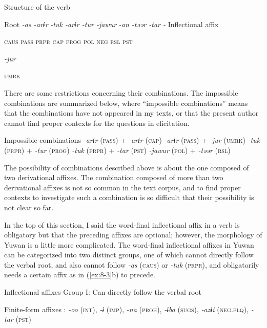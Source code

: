 \ea\label{ex:8-1}
  Structure of the verb

  Root  \textit{-as  -arɨr} %
\textit{-tuk  -arɨr  -tur  -jawur} %
\textit{-an  -təər  -tar  -} Inflectional affix

    \textsc{caus}  \textsc{pass}  \textsc{prpr}  \textsc{cap}  \textsc{prog}  \textsc{pol}  \textsc{neg}  \textsc{rsl}  \textsc{pst}

          \textit{-jur}

          \textsc{umrk}
\z

There are some restrictions concerning their combinations. The impossible combinations are summarized below, where “impossible combinations” means that the combinations have not appeared in my texts, or that the present author cannot find proper contexts for the questions in elicitation.

\ea\label{ex:8-2}
  Impossible combinations
    \ea *\textit{-arɨr} (\textsc{pass})   +  \textit{-arɨr} (\textsc{cap})
    \ex *\textit{-arɨr} (\textsc{pass})   +  \textit{-jur} (\textsc{umrk})
    \ex *\textit{-tuk} (\textsc{prpr})  +  \textit{-tur} (\textsc{prog})
    \ex *\textit{-tuk} (\textsc{prpr})  +  \textit{-tar} (\textsc{pst})
    \ex *\textit{-jawur} (\textsc{pol})  +  \textit{-təər} (\textsc{rsl})
    \z
\z

The possibility of combinations described above is about the one composed of two derivational affixes. The combination composed of more than two derivational affixes is not so common in the text corpus, and to find proper contexts to investigate such a combination is so difficult that their possibility is not clear so far.

  In the top of this section, I said the word-final inflectional affix in a verb is obligatory but that the preceding affixes are optional; however, the morphology of Yuwan is a little more complicated. The word-final inflectional affixes in Yuwan can be categorized into two distinct groups, one of which cannot directly follow the verbal root, and also cannot follow \textit{-as} (\textsc{caus}) or \textit{-tuk} (\textsc{prpr}), and obligatorily needs a certain affix as in (\ref{ex:8-3}b) to precede.

\ea\label{ex:8-3}
  Inflectional affixes
\ea Group I: Can directly follow the verbal root

    Finite-form affixes  : \textit{-oo} (\textsc{int}), \textit{-ɨ} (\textsc{imp}), \textit{-na} (\textsc{proh}), \textit{-ɨba} (\textsc{sugs}), \textit{-azɨi} (\textsc{neg}.\textsc{plq}), \textit{-tar} (\textsc{pst})

